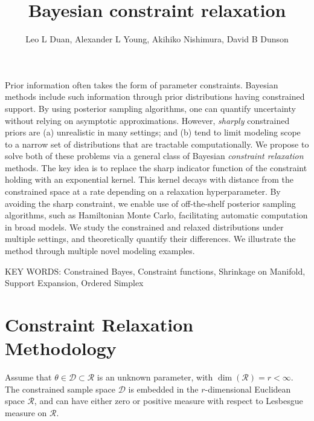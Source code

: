 \documentclass[10pt,fleqn]{article}
\title{\textbf{Bayesian constraint relaxation}}
\author{Leo L Duan, Alexander L Young, Akihiko Nishimura, David B Dunson}
\date{}
\DeclareMathOperator{\1}{\mathbbm{1}} \DeclareMathOperator{\bigO}{\mc O}
\begin{document}
\maketitle %

Prior information often takes  the form of parameter constraints. Bayesian
methods include such information through prior distributions having constrained
support. By using posterior sampling algorithms, one can quantify uncertainty
without relying on asymptotic approximations. However, {\em sharply}
constrained priors are (a) unrealistic in many settings; and (b) tend to limit
modeling scope to a narrow set of distributions that are tractable computationally.
We propose to solve both of these problems via a general class of Bayesian 
{\em constraint relaxation} methods.  The key idea is to replace the sharp
indicator function of the constraint holding with an exponential kernel.  This
kernel decays with distance from the constrained space at a rate depending on 
a relaxation hyperparameter.  By avoiding the sharp constraint, we enable use of
off-the-shelf posterior sampling algorithms, such as Hamiltonian Monte Carlo, 
facilitating automatic computation in broad models. We study the constrained and 
relaxed distributions under multiple settings, and theoretically quantify their 
differences. We illustrate the method through multiple novel modeling examples.

\vskip 12pt
        {\noindent KEY WORDS: Constrained Bayes, Constraint
        functions, Shrinkage on Manifold, Support Expansion, Ordered Simplex}
{}

\newpage



\section{Constraint Relaxation Methodology}

Assume that $\theta \in \mathcal{D} \subset \mathcal{R}$ is an unknown parameter, 
with $\dim(\mathcal{R})=r < \infty$.  The constrained sample space $\mathcal{D}$ is 
embedded in the $r$-dimensional Euclidean space $\mathcal{R}$, and can have 
either zero or positive measure with respect to Lesbesgue measure on $\mathcal{R}$.  
\end{document}
